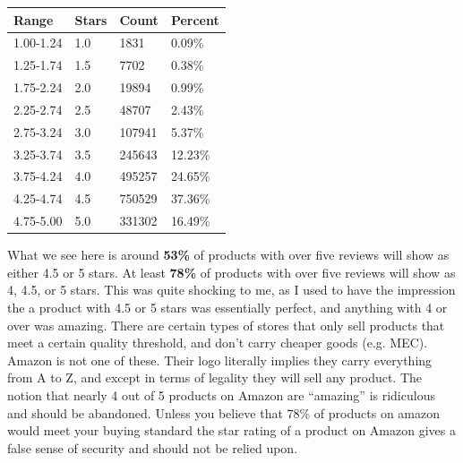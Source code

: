 \documentclass[a4paper,10pt]{article}
\begin{document}
\begin{center}
    \begin{tabular}{l l l l}
    \textbf{Range} & \textbf{Stars} & \textbf{Count} & \textbf{Percent} \\
    \hline
    1.00-1.24 & 1.0 & 1831      & 0.09\% \\
    1.25-1.74 & 1.5 & 7702      & 0.38\% \\
    1.75-2.24 & 2.0 & 19894     & 0.99\% \\
    2.25-2.74 & 2.5 & 48707     & 2.43\% \\
    2.75-3.24 & 3.0 & 107941    & 5.37\% \\
    3.25-3.74 & 3.5 & 245643    & 12.23\% \\
    3.75-4.24 & 4.0 & 495257    & 24.65\% \\
    4.25-4.74 & 4.5 & 750529    & 37.36\% \\
    4.75-5.00 & 5.0 & 331302    & 16.49\% \\
    \end{tabular}
\end{center}
What we see here is around \textbf{53\%} of products with over five reviews will show as either 4.5 or 5 stars. At least \textbf{78\%} of products with over five reviews will show as 4, 4.5, or 5 stars. This was quite shocking to me, as I used to have the impression the a product with 4.5 or 5 stars was essentially perfect, and anything with 4 or over was amazing. There are certain types of stores that only sell products that meet a certain quality threshold, and don't carry cheaper goods (e.g. MEC). Amazon is not one of these. Their logo literally implies they carry everything from A to Z, and except in terms of legality they will sell any product. The notion that nearly 4 out of 5 products on Amazon are \enquote{amazing} is ridiculous and should be abandoned. Unless you believe that 78\% of products on amazon would meet your buying standard the star rating of a product on Amazon gives a false sense of security and should not be relied upon.
\end{document}
